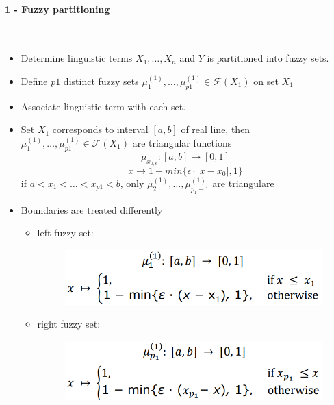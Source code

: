 \documentclass{article}
\begin{document}
\paragraph{1 - Fuzzy partitioning}\mbox{}\\
\begin{itemize}
    \item Determine linguistic terms $X_1,\dots,X_n$ and $Y$ is partitioned into fuzzy sets.
    \item Define $p1$ distinct fuzzy sets $\mu_1^{(1)},\dots,\mu_{p1}^{(1)}\in\mathcal{F}(X_1)$
          on set $X_1$
    \item Associate linguistic term with each set.
    \item Set $X_1$ corresponds to interval $[a,b]$ of real line, then
          $\mu_1^{(1)},\dots,\mu_{p1}^{(1)}\in\mathcal{F}(X_1)$ are triangular functions
          $$\mu_{x_{0,\epsilon}}:[a,b]\rightarrow [0,1]$$
          $$x\rightarrow 1-min\{\epsilon \cdot |x-x_0|, 1\}$$
          if $a<x_1<\dots <x_{p1}<b$, only $\mu_2^{(1)},\dots,\mu_{p_1-1}^{(1)}$ are triangulare
    \item Boundaries are treated differently
          \begin{itemize}
              \item left fuzzy set:
                    \begin{figure}[H]
                        \centering
                        \includegraphics[scale=0.5]{images/left-fuzzy-side.png}
                    \end{figure}
              \item right fuzzy set:
                    \begin{figure}[H]
                        \centering
                        \includegraphics[scale=0.5]{images/right-fuzzy-side.png}
                    \end{figure}
          \end{itemize}
\end{itemize}
\end{document}
